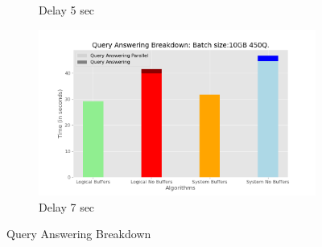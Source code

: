 \begin{figure}
\begin{subfigure}[c]{0.45\textwidth}
		\caption{Delay 5 sec}
		\label{fig:query-answering-breakdown-5}
	\end{subfigure}
	\begin{subfigure}[c]{0.45\textwidth}
		\includegraphics[width=1\textwidth]   {figures/Experiments/Dynamic/Breakdown/dataset_104857600_lockfree_Messi_Results_query_answering_breakdown_10485760_7.png}
		\caption{Delay 7 sec}
		\label{fig:query-answering-breakdown-7}
	\end{subfigure}
	\caption{Query Answering Breakdown}
	\label{query-answering-breakdown-random}
\end{figure}

\clearpage
